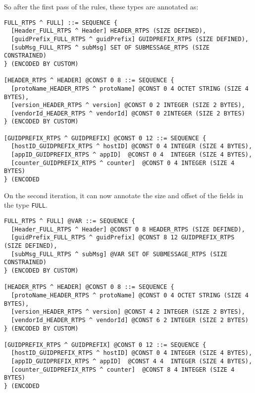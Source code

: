 \documentclass[12pt,oneside,letterpaper]{article}
\begin{document}
So after the first pass of the rules, these types are annotated as:

\begin{lstlisting}[language=SCL2,style=mystyle,frame=none,float,
caption=Before Size Annotations,label=Code:firstSizePass, xleftmargin=3.5ex, xrightmargin=0ex]
FULL_RTPS ^ FULL] ::= SEQUENCE {
  [Header_FULL_RTPS ^ Header] HEADER_RTPS (SIZE DEFINED),
  [guidPrefix_FULL_RTPS ^ guidPrefix] GUIDPREFIX_RTPS (SIZE DEFINED),
  [subMsg_FULL_RTPS ^ subMsg] SET OF SUBMESSAGE_RTPS (SIZE CONSTRAINED)
} (ENCODED BY CUSTOM)

[HEADER_RTPS ^ HEADER] @CONST 0 8 ::= SEQUENCE {
  [protoName_HEADER_RTPS ^ protoName] @CONST 0 4 OCTET STRING (SIZE 4 BYTES),
  [version_HEADER_RTPS ^ version] @CONST 0 2 INTEGER (SIZE 2 BYTES),
  [vendorId_HEADER_RTPS ^ vendorId] @CONST 0 2INTEGER (SIZE 2 BYTES)
} (ENCODED BY CUSTOM)

[GUIDPREFIX_RTPS ^ GUIDPREFIX] @CONST 0 12 ::= SEQUENCE {
  [hostID_GUIDPREFIX_RTPS ^ hostID] @CONST 0 4 INTEGER (SIZE 4 BYTES),
  [appID_GUIDPREFIX_RTPS ^ appID]  @CONST 0 4  INTEGER (SIZE 4 BYTES),
  [counter_GUIDPREFIX_RTPS ^ counter]  @CONST 0 4 INTEGER (SIZE 4 BYTES)
} (ENCODED 
\end{lstlisting}

On the second iteration, it can now annotate the size and offset of the fields in the type \texttt{FULL}.

\begin{lstlisting}[language=SCL2,style=mystyle,frame=none,float,
caption=Before Size Annotations,label=Code:firstSizePass, xleftmargin=3.5ex, xrightmargin=0ex]
FULL_RTPS ^ FULL] @VAR ::= SEQUENCE {
  [Header_FULL_RTPS ^ Header] @CONST 0 8 HEADER_RTPS (SIZE DEFINED),
  [guidPrefix_FULL_RTPS ^ guidPrefix] @CONST 8 12 GUIDPREFIX_RTPS (SIZE DEFINED),
  [subMsg_FULL_RTPS ^ subMsg] @VAR SET OF SUBMESSAGE_RTPS (SIZE CONSTRAINED)
} (ENCODED BY CUSTOM)

[HEADER_RTPS ^ HEADER] @CONST 0 8 ::= SEQUENCE {
  [protoName_HEADER_RTPS ^ protoName] @CONST 0 4 OCTET STRING (SIZE 4 BYTES),
  [version_HEADER_RTPS ^ version] @CONST 4 2 INTEGER (SIZE 2 BYTES),
  [vendorId_HEADER_RTPS ^ vendorId] @CONST 6 2 INTEGER (SIZE 2 BYTES)
} (ENCODED BY CUSTOM)

[GUIDPREFIX_RTPS ^ GUIDPREFIX] @CONST 0 12 ::= SEQUENCE {
  [hostID_GUIDPREFIX_RTPS ^ hostID] @CONST 0 4 INTEGER (SIZE 4 BYTES),
  [appID_GUIDPREFIX_RTPS ^ appID]  @CONST 4 4  INTEGER (SIZE 4 BYTES),
  [counter_GUIDPREFIX_RTPS ^ counter]  @CONST 8 4 INTEGER (SIZE 4 BYTES)
} (ENCODED 
\end{lstlisting}
\end{document}

